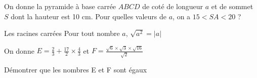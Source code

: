 
 
On donne la pyramide à base carrée $ABCD$ de coté de longueur $a$ et de sommet $S$ dont la hauteur est 10 cm.
Pour quelles valeurs de $a$, on a $15 < SA < 20$ ?


\begin{ThT}{Les racines carrées}
Pour tout nombre $a$, $\sqrt{a^2}= \vert a \vert$
\end{ThT}


On donne $E = \frac{2}{3}+\frac{17}{2} \times \frac{4}{3}$ et $F = \frac{\sqrt 6 \times \sqrt 3\times \sqrt{16} }{\sqrt 2}  $ 
 
Démontrer que les nombres E et F sont égaux
